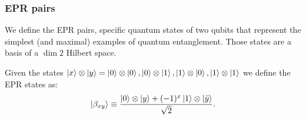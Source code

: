 \subsubsection{EPR pairs}
We define the EPR pairs, specific quantum states of two qubits that represent the simplest (and maximal) examples of quantum entanglement. Those states are a basis of a $\dim{2}$ Hilbert space.

Given the states $\ket{x} \otimes \ket{y} = \ket{0} \otimes \ket{0}, \ket{0} \otimes \ket{1}, \ket{1} \otimes \ket{0}, \ket{1} \otimes \ket{1}$ we define the EPR states as:
\begin{equation}
    \ket{\beta_{x y}} \equiv \frac{\ket{0} \otimes \ket{y} +(-1)^{x} \ket{1} \otimes \ket{\bar{y}}}{\sqrt{2}}.
\end{equation}
